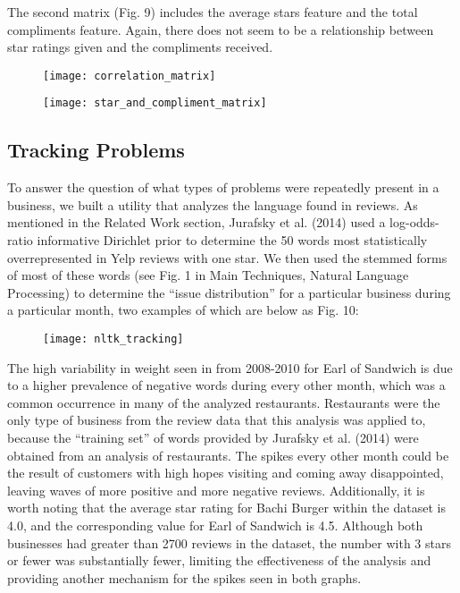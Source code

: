 \quad The second matrix (Fig. 9) includes the average stars feature and the total compliments feature. Again, there does not seem to be a relationship between star ratings given and the compliments received.

\begin{figure}[h]
\texttt{[image: correlation\_matrix]}
\end{figure}

\begin{figure}[h]
\texttt{[image: star\_and\_compliment\_matrix]}
\end{figure}

\subsection{Tracking Problems}

\quad To answer the question of what types of problems were repeatedly present in a business, we built a utility that analyzes the language found in reviews. As mentioned in the Related Work section, Jurafsky et al. (2014) used a log-odds-ratio informative Dirichlet prior to determine the 50 words most statistically overrepresented in Yelp reviews with one star. We then used the stemmed forms of most of these words (see Fig. 1 in Main Techniques, Natural Language Processing) to determine the “issue distribution” for a particular business during a particular month, two examples of which are below as Fig. 10:

\begin{figure}[h]
\texttt{[image: nltk\_tracking]}
\end{figure}

\quad The high variability in weight seen in from 2008-2010 for Earl of Sandwich is due to a higher prevalence of negative words during every other month, which was a common occurrence in many of the analyzed restaurants. Restaurants were the only type of business from the review data that this analysis was applied to, because the “training set” of words provided by Jurafsky et al. (2014) were obtained from an analysis of restaurants. The spikes every other month could be the result of customers with high hopes visiting and coming away disappointed, leaving waves of more positive and more negative reviews. Additionally, it is worth noting that the average star rating for Bachi Burger within the dataset is 4.0, and the corresponding value for Earl of Sandwich is 4.5. Although both businesses had greater than 2700 reviews in the dataset, the number with 3 stars or fewer was substantially fewer, limiting the effectiveness of the analysis and providing another mechanism for the spikes seen in both graphs.

